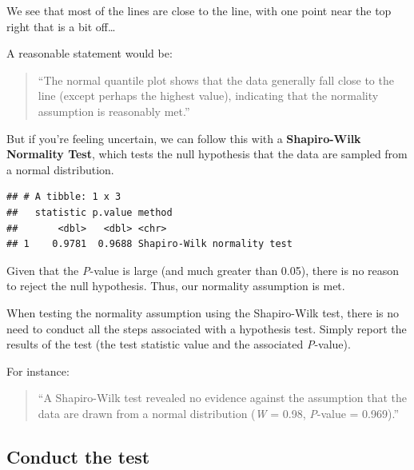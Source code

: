 \documentclass[
]{book}
\newenvironment{Shaded}{\begin{snugshade}}{\end{snugshade}}
\newcommand{\FunctionTok}[1]{\textcolor[rgb]{0.13,0.29,0.53}{\textbf{#1}}}
\newcommand{\NormalTok}[1]{#1}
\newcommand{\OtherTok}[1]{\textcolor[rgb]{0.56,0.35,0.01}{#1}}
\newcommand{\SpecialCharTok}[1]{\textcolor[rgb]{0.81,0.36,0.00}{\textbf{#1}}}
\begin{document}
We see that most of the lines are close to the line, with one point near the top right that is a bit off\ldots{}

A reasonable statement would be:

\begin{quote}
``The normal quantile plot shows that the data generally fall close to the line (except perhaps the highest value), indicating that the normality assumption is reasonably met.''
\end{quote}

But if you're feeling uncertain, we can follow this with a \textbf{Shapiro-Wilk Normality Test}, which tests the null hypothesis that the data are sampled from a normal distribution.

\begin{Shaded}
\end{Shaded}

\begin{verbatim}
## # A tibble: 1 x 3
##   statistic p.value method                     
##       <dbl>   <dbl> <chr>                      
## 1    0.9781  0.9688 Shapiro-Wilk normality test
\end{verbatim}

Given that the \emph{P}-value is large (and much greater than 0.05), there is no reason to reject the null hypothesis. Thus, our normality assumption is met.

When testing the normality assumption using the Shapiro-Wilk test, there is no need to conduct all the steps associated with a hypothesis test. Simply report the results of the test (the test statistic value and the associated \emph{P}-value).

For instance:

\begin{quote}
``A Shapiro-Wilk test revealed no evidence against the assumption that the data are drawn from a normal distribution (\emph{W} = 0.98, \emph{P}-value = 0.969).''
\end{quote}

\subsection{Conduct the test}\label{conduct_paired}
\end{document}
